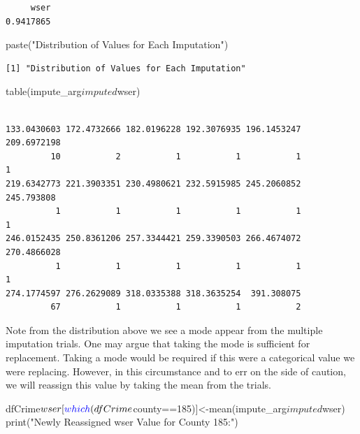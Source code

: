 \documentclass[]{article}
\newenvironment{Shaded}{}{}
\newcommand{\DecValTok}[1]{#1}
\newcommand{\KeywordTok}[1]{\textcolor[rgb]{0.00,0.00,1.00}{#1}}
\newcommand{\NormalTok}[1]{#1}
\newcommand{\OperatorTok}[1]{#1}
\newcommand{\StringTok}[1]{\textcolor[rgb]{0.00,0.50,0.50}{#1}}
\begin{document}
\begin{verbatim}
     wser 
0.9417865 
\end{verbatim}

\begin{Shaded}
\begin{Highlighting}[]
\KeywordTok{paste}\NormalTok{(}\StringTok{"Distribution of Values for Each Imputation"}\NormalTok{)}
\end{Highlighting}
\end{Shaded}

\begin{verbatim}
[1] "Distribution of Values for Each Imputation"
\end{verbatim}

\begin{Shaded}
\begin{Highlighting}[]
\KeywordTok{table}\NormalTok{(impute_arg}\OperatorTok{$}\NormalTok{imputed}\OperatorTok{$}\NormalTok{wser)}
\end{Highlighting}
\end{Shaded}

\begin{verbatim}

133.0430603 172.4732666 182.0196228 192.3076935 196.1453247 209.6972198 
         10           2           1           1           1           1 
219.6342773 221.3903351 230.4980621 232.5915985 245.2060852  245.793808 
          1           1           1           1           1           1 
246.0152435 250.8361206 257.3344421 259.3390503 266.4674072 270.4866028 
          1           1           1           1           1           1 
274.1774597 276.2629089 318.0335388 318.3635254  391.308075 
         67           1           1           1           2 
\end{verbatim}

Note from the distribution above we see a mode appear from the multiple
imputation trials. One may argue that taking the mode is sufficient for
replacement. Taking a mode would be required if this were a categorical
value we were replacing. However, in this circumstance and to err on the
side of caution, we will reassign this value by taking the mean from the
trials.

\begin{Shaded}
\begin{Highlighting}[]
\NormalTok{dfCrime}\OperatorTok{$}\NormalTok{wser[}\KeywordTok{which}\NormalTok{(dfCrime}\OperatorTok{$}\NormalTok{county}\OperatorTok{==}\DecValTok{185}\NormalTok{)]<-}\KeywordTok{mean}\NormalTok{(impute_arg}\OperatorTok{$}\NormalTok{imputed}\OperatorTok{$}\NormalTok{wser)}
\KeywordTok{print}\NormalTok{(}\StringTok{"Newly Reassigned wser Value for County 185:"}\NormalTok{)}
\end{Highlighting}
\end{Shaded}
\end{document}
